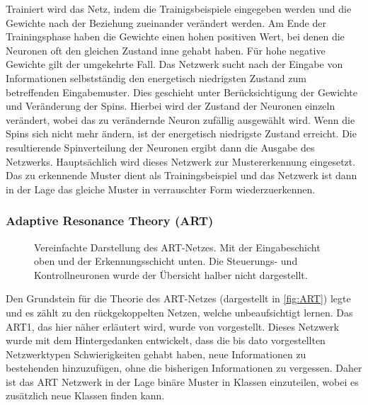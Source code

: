 Trainiert wird das Netz, indem die Trainigsbeispiele eingegeben werden und die Gewichte nach der Beziehung zueinander verändert werden. Am Ende der Trainingsphase haben die Gewichte einen hohen positiven Wert, bei denen die Neuronen oft den gleichen Zustand inne gehabt haben. Für hohe negative Gewichte gilt der umgekehrte Fall. Das Netzwerk sucht nach der Eingabe von Informationen selbstständig den energetisch niedrigsten Zustand zum betreffenden Eingabemuster. Dies geschieht unter Berücksichtigung der Gewichte und Veränderung der Spins. Hierbei wird der Zustand der Neuronen einzeln verändert, wobei das zu verändernde Neuron zufällig ausgewählt wird. Wenn die Spins sich nicht mehr ändern, ist der energetisch niedrigste Zustand erreicht. Die resultierende Spinverteilung der Neuronen ergibt dann die Ausgabe des Netzwerks. Hauptsächlich wird dieses Netzwerk zur Mustererkennung eingesetzt. Das zu erkennende Muster dient als Trainingsbeispiel und das Netzwerk ist dann in der Lage das gleiche Muster in verrauschter Form wiederzuerkennen.


\subsubsection{Adaptive Resonance Theory (ART)}%
\begin{figure}[!htb]
    \centering
        
    \caption[Darstellung eines ART]{Vereinfachte Darstellung des ART-Netzes. Mit der Eingabeschicht oben und der Erkennungsschicht unten. Die Steuerungs- und Kontrollneuronen wurde der Übersicht halber nicht dargestellt.\,\protect\footnotemark{}}
    \label{fig:ART}
\end{figure}
\addtocounter{footnote}{-1}     %
\addtocounter{Hfootnote}{-1}    %
\wrapfigfoot{}
Den Grundstein für die Theorie des \gls{ART}-Netzes (dargestellt in \autoref{fig:ART}) legte \citet{Grossberg1973} und es zählt zu den rückgekoppelten Netzen, welche unbeaufsichtigt lernen. Das ART1, das hier näher erläutert wird, wurde von \citet{Carpenter1987} vorgestellt. Dieses Netzwerk wurde mit dem Hintergedanken entwickelt, dass die bis dato vorgestellten Netzwerktypen Schwierigkeiten gehabt haben, neue Informationen zu bestehenden hinzuzufügen, ohne die bisherigen Informationen zu \glqq vergessen\grqq . Daher ist das ART Netzwerk in der Lage binäre Muster in Klassen einzuteilen, wobei es zusätzlich neue Klassen finden kann. 

